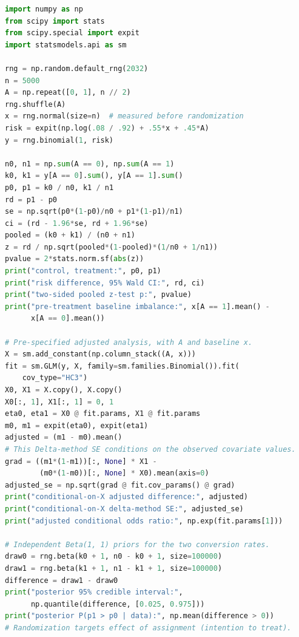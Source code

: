 \begin{lstlisting}[language=Python,caption={Kompletny program: A/B testing z analizą podstawową, standaryzacją logistyczną i posteriorowym porównaniem odsetków (Python, NumPy, SciPy, statsmodels).}]
import numpy as np
from scipy import stats
from scipy.special import expit
import statsmodels.api as sm

rng = np.random.default_rng(2032)
n = 5000
A = np.repeat([0, 1], n // 2)
rng.shuffle(A)
x = rng.normal(size=n)  # measured before randomization
risk = expit(np.log(.08 / .92) + .55*x + .45*A)
y = rng.binomial(1, risk)

n0, n1 = np.sum(A == 0), np.sum(A == 1)
k0, k1 = y[A == 0].sum(), y[A == 1].sum()
p0, p1 = k0 / n0, k1 / n1
rd = p1 - p0
se = np.sqrt(p0*(1-p0)/n0 + p1*(1-p1)/n1)
ci = (rd - 1.96*se, rd + 1.96*se)
pooled = (k0 + k1) / (n0 + n1)
z = rd / np.sqrt(pooled*(1-pooled)*(1/n0 + 1/n1))
pvalue = 2*stats.norm.sf(abs(z))
print("control, treatment:", p0, p1)
print("risk difference, 95% Wald CI:", rd, ci)
print("two-sided pooled z-test p:", pvalue)
print("pre-treatment baseline imbalance:", x[A == 1].mean() -
      x[A == 0].mean())

# Pre-specified adjusted analysis, with A and baseline x.
X = sm.add_constant(np.column_stack((A, x)))
fit = sm.GLM(y, X, family=sm.families.Binomial()).fit(
    cov_type="HC3")
X0, X1 = X.copy(), X.copy()
X0[:, 1], X1[:, 1] = 0, 1
eta0, eta1 = X0 @ fit.params, X1 @ fit.params
m0, m1 = expit(eta0), expit(eta1)
adjusted = (m1 - m0).mean()
# This Delta-method SE conditions on the observed covariate values.
grad = ((m1*(1-m1))[:, None] * X1 -
        (m0*(1-m0))[:, None] * X0).mean(axis=0)
adjusted_se = np.sqrt(grad @ fit.cov_params() @ grad)
print("conditional-on-X adjusted difference:", adjusted)
print("conditional-on-X delta-method SE:", adjusted_se)
print("adjusted conditional odds ratio:", np.exp(fit.params[1]))

# Independent Beta(1, 1) priors for the two conversion rates.
draw0 = rng.beta(k0 + 1, n0 - k0 + 1, size=100000)
draw1 = rng.beta(k1 + 1, n1 - k1 + 1, size=100000)
difference = draw1 - draw0
print("posterior 95% credible interval:",
      np.quantile(difference, [0.025, 0.975]))
print("posterior P(p1 > p0 | data):", np.mean(difference > 0))
# Randomization targets effect of assignment (intention to treat).
\end{lstlisting}

